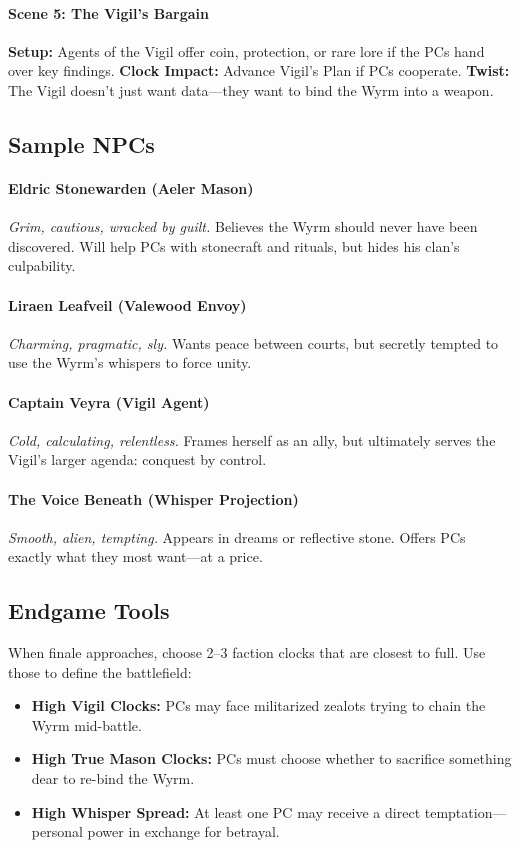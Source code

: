 \documentclass[12pt]{article}
\begin{document}
\paragraph{Scene 5: The Vigil’s Bargain}
\textbf{Setup:} Agents of the Vigil offer coin, protection, or rare lore if the PCs hand over key findings.
\textbf{Clock Impact:} Advance Vigil’s Plan if PCs cooperate.
\textbf{Twist:} The Vigil doesn’t just want data—they want to bind the Wyrm into a weapon.

\subsection*{Sample NPCs}

\paragraph{Eldric Stonewarden (Aeler Mason)}
\emph{Grim, cautious, wracked by guilt.} Believes the Wyrm should never have been discovered. Will help PCs with stonecraft and rituals, but hides his clan’s culpability.

\paragraph{Liraen Leafveil (Valewood Envoy)}
\emph{Charming, pragmatic, sly.} Wants peace between courts, but secretly tempted to use the Wyrm’s whispers to force unity.

\paragraph{Captain Veyra (Vigil Agent)}
\emph{Cold, calculating, relentless.} Frames herself as an ally, but ultimately serves the Vigil’s larger agenda: conquest by control.

\paragraph{The Voice Beneath (Whisper Projection)}
\emph{Smooth, alien, tempting.} Appears in dreams or reflective stone. Offers PCs exactly what they most want—at a price.

\subsection*{Endgame Tools}
When finale approaches, choose 2--3 faction clocks that are closest to full. Use those to define the battlefield:
\begin{itemize}
  \item \textbf{High Vigil Clocks:} PCs may face militarized zealots trying to chain the Wyrm mid-battle.
  \item \textbf{High True Mason Clocks:} PCs must choose whether to sacrifice something dear to re-bind the Wyrm.
  \item \textbf{High Whisper Spread:} At least one PC may receive a direct temptation—personal power in exchange for betrayal.
\end{itemize}
\end{document}
